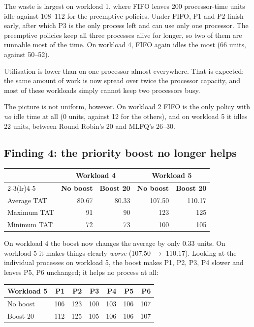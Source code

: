 \documentclass[11pt,a4paper]{article}
\begin{document}
The waste is largest on workload 1, where FIFO leaves 200 processor-time units idle against
108--112 for the preemptive policies. Under FIFO, P1 and P2 finish early, after which P3 is the
only process left and can use only one processor. The preemptive policies keep all three
processes alive for longer, so two of them are runnable most of the time. On workload 4,
FIFO again idles the most (66 units, against 50--52).

Utilisation is lower than on one processor almost everywhere. That is expected: the same
amount of work is now spread over twice the processor capacity, and most of these workloads
simply cannot keep two processors busy.

The picture is not uniform, however. On workload 2 FIFO is the only policy with \emph{no}
idle time at all (0 units, against 12 for the others), and on workload 5 it idles 22 units,
between Round Robin's 20 and MLFQ's 26--30.

\subsection{Finding 4: the priority boost no longer helps}

\begin{center}\small
\begin{tabular}{lrrrr}
\toprule
& \multicolumn{2}{c}{\textbf{Workload 4}} & \multicolumn{2}{c}{\textbf{Workload 5}}\\
\cmidrule(lr){2-3}\cmidrule(lr){4-5}
& \textbf{No boost} & \textbf{Boost 20} & \textbf{No boost} & \textbf{Boost 20}\\
\midrule
Average TAT & 80.67 & 80.33 & 107.50 & 110.17 \\
Maximum TAT & 91 & 90 & 123 & 125 \\
Minimum TAT & 72 & 73 & 100 & 105 \\
\bottomrule\end{tabular}\end{center}

On workload 4 the boost now changes the average by only 0.33 units. On workload 5 it makes
things clearly \emph{worse} (107.50 $\rightarrow$ 110.17). Looking at the individual processes on
workload 5, the boost makes P1, P2, P3, P4 slower and leaves P5, P6 unchanged; it helps no process at all:

\begin{center}\small
\begin{tabular}{lrrrrrr}
\toprule
\textbf{Workload 5} & \textbf{P1} & \textbf{P2} & \textbf{P3} & \textbf{P4} & \textbf{P5} & \textbf{P6}\\
\midrule
No boost & 106 & 123 & 100 & 103 & 106 & 107 \\
Boost 20 & 112 & 125 & 105 & 106 & 106 & 107 \\
\bottomrule
\end{tabular}
\end{center}
\end{document}
